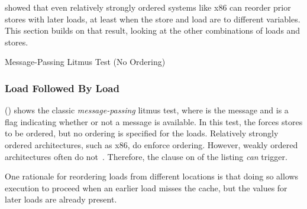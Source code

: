 showed that even relatively strongly ordered systems like x86
can reorder prior stores with later loads, at least when the
store and load are to different variables.
This section builds on that result, looking at the other combinations of
loads and stores.

\begin{listing}

\caption{Message-Passing Litmus Test (No Ordering)}
\label{lst:memorder:Message-Passing Litmus Test (No Ordering)}
\end{listing}

\subsubsection{Load Followed By Load}
\label{sec:memorder:Load Followed By Load}

\begin{fcvref}
()
shows the classic \emph{message-passing} litmus test, where  is
the message and  is a flag indicating whether or not a message
is available.
In this test, the  forces  stores to be ordered,
but no ordering is specified for the loads.
Relatively strongly ordered architectures, such as x86, do enforce ordering.
However, weakly ordered architectures often do
not~\cite{JadeAlglave2011ppcmem}.
Therefore, the  clause on  of the listing \emph{can}
trigger.
\end{fcvref}

One rationale for reordering loads from different locations is that doing
so allows execution to proceed when an earlier load misses the cache,
but the values for later loads are already present.

\QuickQuizEnd

